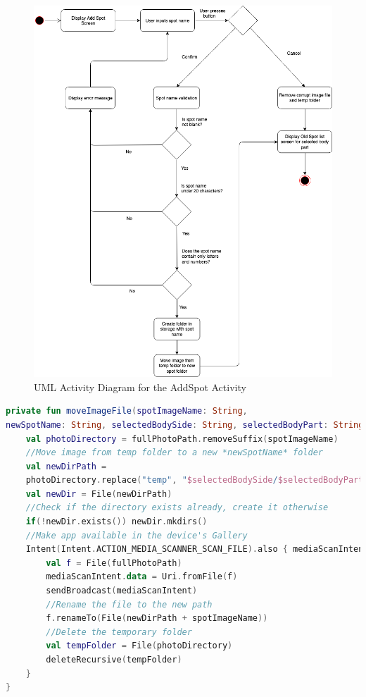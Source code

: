 \begin{figure}
    \includegraphics[width=1.2\textwidth, center]{figures/AddSpot.png}
    \caption{UML Activity Diagram for the AddSpot Activity}
    \label{fig:AddSpot}
\end{figure}

\begin{lstlisting}[caption={Adding a Spot}, label={lst:addSpot}, language=Kotlin]
private fun moveImageFile(spotImageName: String, 
newSpotName: String, selectedBodySide: String, selectedBodyPart: String) {
    val photoDirectory = fullPhotoPath.removeSuffix(spotImageName)
    //Move image from temp folder to a new *newSpotName* folder
    val newDirPath = 
    photoDirectory.replace("temp", "$selectedBodySide/$selectedBodyPart/$newSpotName")
    val newDir = File(newDirPath)
    //Check if the directory exists already, create it otherwise
    if(!newDir.exists()) newDir.mkdirs()
    //Make app available in the device's Gallery
    Intent(Intent.ACTION_MEDIA_SCANNER_SCAN_FILE).also { mediaScanIntent ->
        val f = File(fullPhotoPath)
        mediaScanIntent.data = Uri.fromFile(f)
        sendBroadcast(mediaScanIntent)
        //Rename the file to the new path
        f.renameTo(File(newDirPath + spotImageName))
        //Delete the temporary folder
        val tempFolder = File(photoDirectory)
        deleteRecursive(tempFolder)
    }
}
\end{lstlisting}

